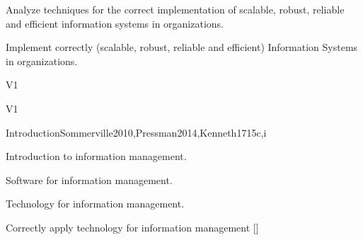 \begin{syllabus}


\begin{justification}
Analyze techniques for the correct implementation of scalable, robust, reliable and efficient information systems in organizations.
\end{justification}

\begin{goals}
\item Implement correctly (scalable, robust, reliable and efficient) Information Systems in organizations.
\end{goals}

\begin{outcomes}{V1}
    \item {}
    \item {}
    \item {}
\end{outcomes}

\begin{competences}{V1}
    \item {} 
    \item {} 
    \item {} 
    \item {} 
    \item {} 
    \item {} 
\end{competences}

\begin{unit}{Introduction}{}{Sommerville2010,Pressman2014,Kenneth17}{15}{c,i}
\begin{topics}
    \item Introduction to information management.
    \item Software for information management.
    \item Technology for information management.
\end{topics}
\begin{learningoutcomes}
    \item Correctly apply technology for information management [\Assessment]
\end{learningoutcomes}
\end{unit}


\end{syllabus}
